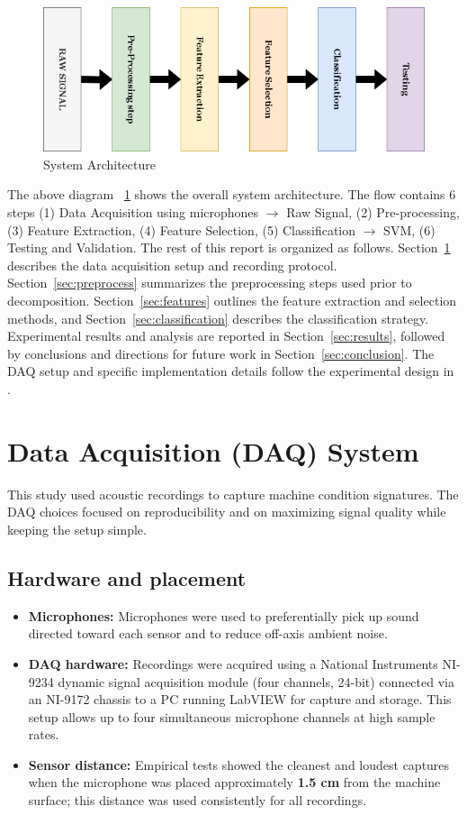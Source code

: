 \documentclass[12pt,a4paper]{article}
\begin{document}
\begin{figure}[H]
    \centering
    \includegraphics[width=0.75\linewidth]{Diagrams/icbmintro.drawio.png}
    \caption{System Architecture}
    \label{fig:sysarch}
\end{figure}
\begin{multicols}{2}

The above diagram ~\ref{fig:sysarch} shows the overall system architecture. The flow contains 6 steps (1) Data Acquisition using microphones $\rightarrow$ Raw Signal, (2) Pre-processing, (3) Feature Extraction, (4) Feature Selection, (5) Classification $\rightarrow$ SVM, (6) Testing and Validation.
The rest of this report is organized as follows. Section~\ref{sec:daq} describes the data acquisition setup and recording protocol. Section~\ref{sec:preprocess} summarizes the preprocessing steps used prior to decomposition. Section~\ref{sec:features} outlines the feature extraction and selection methods, and Section~\ref{sec:classification} describes the classification strategy. Experimental results and analysis are reported in Section~\ref{sec:results}, followed by conclusions and directions for future work in Section~\ref{sec:conclusion}. The DAQ setup and specific implementation details follow the experimental design in \cite{Verma2016}.

\section{Data Acquisition (DAQ) System}
\label{sec:daq}

This study used acoustic recordings to capture machine condition signatures. The DAQ choices focused on reproducibility and on maximizing signal quality while keeping the setup simple.

\subsection{Hardware and placement}
\begin{itemize}
  \item \textbf{Microphones:} Microphones were used to preferentially pick up sound directed toward each sensor and to reduce off-axis ambient noise.
  \item \textbf{DAQ hardware:} Recordings were acquired using a National Instruments NI-9234 dynamic signal acquisition module (four channels, 24-bit) connected via an NI-9172 chassis to a PC running LabVIEW for capture and storage. This setup allows up to four simultaneous microphone channels at high sample rates.
  \item \textbf{Sensor distance:} Empirical tests showed the cleanest and loudest captures when the microphone was placed approximately \textbf{1.5 cm} from the machine surface; this distance was used consistently for all recordings.
\end{itemize}

\end{multicols}
\end{document}

